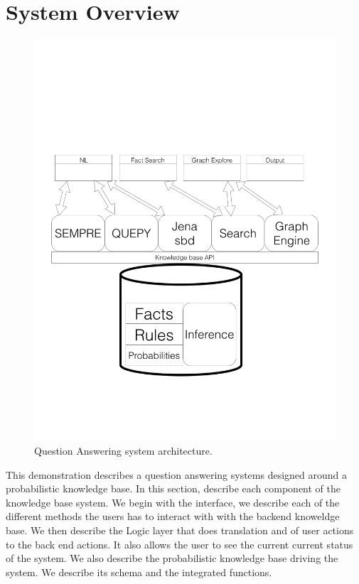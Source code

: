 
\section{System Overview}

\begin{figure}
\includegraphics[width=\columnwidth,clip=true,trim=0cm 4cm 0cm 10cm]{images/qaarchitecture.png}
\caption{Question Answering system architecture.}
\label{fig:qaarchitecture}
\end{figure}



This demonstration describes a question answering systems designed around
a probabilistic knowledge base.
In this section, describe each component of the knowledge base system.
We begin with the interface, we describe each of the different methods
the users has to interact with with the backend knoweldge base.
We then describe the Logic layer that does translation and of user actions
to the back end actions. It also allows the user to see the current current
status of the system.
We also describe the probabilistic knowledge base driving the system.
We describe its schema and the integrated functions.



